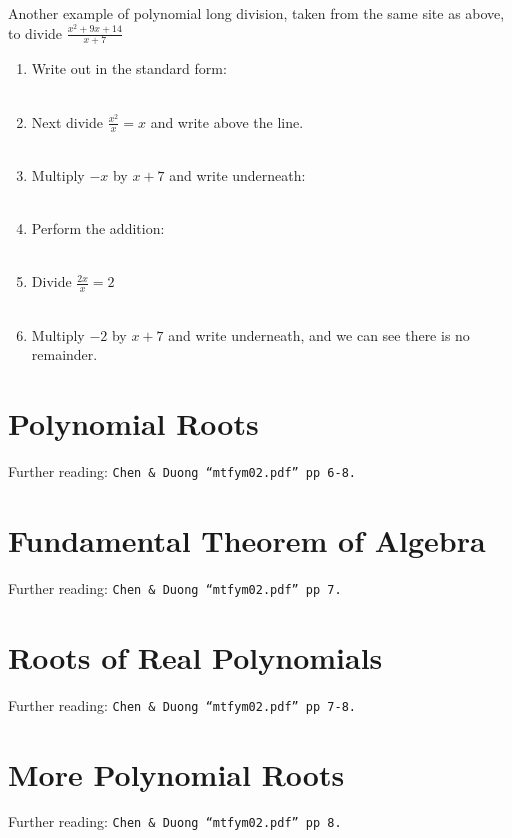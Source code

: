 Another example of polynomial long division, taken from the same site as above,
to divide $\frac{x^2 +9x +14}{x +7}$
\begin{enumerate}
  \item Write out in the standard form:
  \\  \\
  \item Next divide $\frac{x^2}{x}=x$ and write above the line.
  \\  \\
  \item Multiply $-x$ by $x+7$ and write underneath:
  \\  \\
  \item Perform the addition:
  \\  \\
  \item Divide $\frac{2x}{x}=2$
  \\  \\
  \item Multiply $-2$ by $x+7$ and write underneath, and we can see there is no
  remainder.
  \\ 
\end{enumerate}

\section{Polynomial Roots}
\label{sec:P Polynomial Root}
Further reading: \texttt{Chen \& Duong ``mtfym02.pdf'' pp 6-8.}

\section{Fundamental Theorem of Algebra}
\label{sec:P Fundamental Theorem of Algebra}
Further reading: \texttt{Chen \& Duong ``mtfym02.pdf'' pp 7.}

\section{Roots of Real Polynomials}
\label{sec:P Roots of Real Polynomial}
Further reading: \texttt{Chen \& Duong ``mtfym02.pdf'' pp 7-8.}

\section{More Polynomial Roots}
\label{sec:P More Polynomial Root}
Further reading: \texttt{Chen \& Duong ``mtfym02.pdf'' pp 8.}

